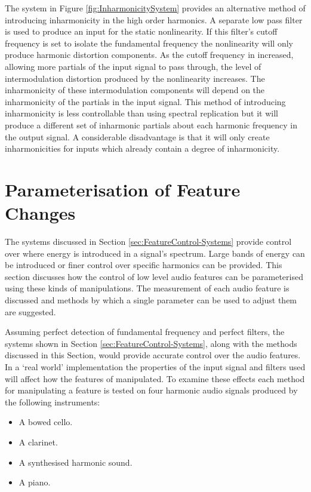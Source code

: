 		The system in Figure \ref{fig:InharmonicitySystem} provides an alternative method of introducing
		inharmonicity in the high order harmonics. A separate low pass filter is used to produce an input for the
		static nonlinearity. If this filter's cutoff frequency is set to isolate the fundamental frequency the
		nonlinearity will only produce harmonic distortion components. As the cutoff frequency in increased,
		allowing more partials of the input signal to pass through, the level of intermodulation distortion
		produced by the nonlinearity increases. The inharmonicity of these intermodulation components will depend
		on the inharmonicity of the partials in the input signal. This method of introducing inharmonicity is less
		controllable than using spectral replication but it will produce a different set of inharmonic partials
		about each harmonic frequency in the output signal. A considerable disadvantage is that it will only create
		inharmonicities for inputs which already contain a degree of inharmonicity.

\section{Parameterisation of Feature Changes}
\label{sec:FeatureControl-Parameterisation}
	The systems discussed in Section \ref{sec:FeatureControl-Systems} provide control over where energy is introduced
	in a signal's spectrum. Large bands of energy can be introduced or finer control over specific harmonics can be
	provided. This section discusses how the control of low level audio features can be parameterised using these kinds
	of manipulations. The measurement of each audio feature is discussed and methods by which a single parameter can be
	used to adjust them are suggested.

	Assuming perfect detection of fundamental frequency and perfect filters, the systems shown in Section
	\ref{sec:FeatureControl-Systems}, along with the methods discussed in this Section, would provide accurate control
	over the audio features. In a `real world' implementation the properties of the input signal and filters used will
	affect how the features of manipulated. To examine these effects each method for manipulating a feature is tested
	on four harmonic audio signals produced by the following instruments:

	\begin{itemize}
		\item A bowed cello. 
		\item A clarinet. 
		\item A synthesised harmonic sound. 
		\item A piano. 
	\end{itemize}

